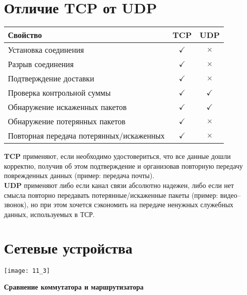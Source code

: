 \section{Отличие TCP от UDP}
\begin{table}[h]
\begin{tabular}{|l|c|c|}
\hline
Свойство & TCP & UDP \\
\hline
Установка соединения & $\checkmark$ & $\times$ \\
Разрыв соединения &  $\checkmark$ & $\times$ \\
Подтверждение доставки &  $\checkmark$ & $\times$ \\
Проверка контрольной суммы  & $\checkmark$ & $\checkmark$ \\
Обнаружение искаженных пакетов & $\checkmark$ & $\checkmark$ \\
Обнаружение потерянных пакетов & $\checkmark$ & $\times$ \\
Повторная передача потерянных/искаженных & $\checkmark$ & $\times$ \\
\hline
\end{tabular}
\end{table}
\textbf{TCP} применяют, если необходимо удостовериться, что все данные дошли корректно, получив об этом подтверждение и организовав повторную передачу поврежденных данных (пример: передача почты).
\\\textbf{UDP} применяют либо если канал связи абсолютно надежен, либо если нет смысла повторно передавать потерянные/искаженные пакеты (пример: видео--звонок), но при этом хочется сэкономить на передаче ненужных служебных данных, используемых в ТСР.
\section{Сетевые устройства}

\begin{minipage}{\textwidth}
\texttt{[image: 11\_3]}
\end{minipage}

\begin{center}
  \textbf{Сравнение коммутатора и маршрутизатора}
\end{center}

